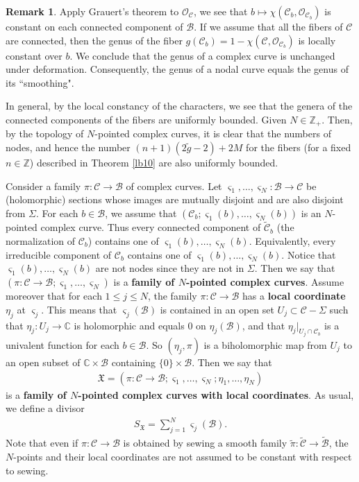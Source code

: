 \documentclass[12pt,a4paper,notitlepage]{report}
\theoremstyle{definition}
\newtheorem{rem}[df]{Remark}
\theoremstyle{plain}
\newcommand{\fk}{\mathfrak}
\newcommand{\mc}{\mathcal}
\newcommand{\wtd}{\widetilde}
\newcommand{\scr}{\mathscr}
\newcommand{\sgm}{\varsigma}
\newcommand{\SX}{S_{\fk X}}
\newcommand{\mbb}{\mathbb}
\newcommand{\Cbb}{\mathbb C}
\newcommand{\Zbb}{\mathbb Z}
\numberwithin{equation}{section}
\begin{document}
\begin{rem}\label{lb124}
Apply Grauert's theorem to $\scr O_{\mc C}$, we see that $b\mapsto\chi(\mc C_b,\scr O_{\mc C_b})$ is constant on each connected component of $\mc B$. If we assume that all the fibers of $\mc C$ are  connected, then the genus of the fiber $g(\mc C_b)=1-\chi(\mc C,\scr O_{\mc C_b})$ is locally constant over $b$. We conclude that the genus of a complex curve is unchanged under deformation. Consequently, the genus of a nodal curve equals the genus of its ``smoothing". 

In general, by the local constancy of the characters, we see that the genera of the connected components of the fibers are uniformly bounded. Given $N\in \Zbb_+$. Then, by the topology of $N$-pointed complex curves, it is clear that the numbers of nodes, and hence the number $(n+1)(2\wtd g-2)+2M$ for the fibers (for a fixed $n\in\Zbb$) described in Theorem \ref{lb10} are also uniformly bounded. 
\end{rem}

Consider a family $\pi:\mc C\rightarrow\mc B$ of complex curves. Let $\sgm_1,\dots,\sgm_N:\mc B\rightarrow\mc C$ be (holomorphic) sections whose images are mutually disjoint and are also disjoint from $\Sigma$. For each $b\in\mc B$, we assume that $(\mc C_b;\sgm_1(b),\dots,\sgm_N(b))$ is an $N$-pointed complex curve. Thus every connected component of $\wtd{\mc C}_b$ (the normalization  of $\mc C_b$) contains one of $\sgm_1(b),\dots,\sgm_N(b)$. Equivalently, every irreducible component of $\mc C_b$ contains one of $\sgm_1(b),\dots,\sgm_N(b)$. Notice that  $\sgm_1(b),\dots,\sgm_N(b)$ are not nodes since they are not in $\Sigma$. Then we say that $(\pi:\mc C\rightarrow\mc B;\sgm_1,\dots,\sgm_N)$ is a \textbf{family of $N$-pointed complex curves}. Assume moreover that for each $1\leq j\leq N$, the family $\pi:\mc C\rightarrow\mc B$ has a \textbf{local coordinate} $\eta_j$ at $\sgm_j$. This means that $\sgm_j(\mc B)$ is contained in an open set $U_j\subset\mc C-\Sigma$ such that $\eta_j:U_j\rightarrow\Cbb$ is holomorphic and equals $0$ on $\eta_j(\mc B)$,  and that $\eta_j|_{U_j\cap\mc C_b}$ is a univalent function  for each $b\in\mc B$. So $(\eta_j,\pi)$ is a biholomorphic map from $U_j$ to an open subset of $\mbb C\times\mc B$ containing $\{0\}\times\mc B$. Then we say that 
\begin{align*}
\fk X=(\pi:\mc C\rightarrow\mc B;\sgm_1,\dots,\sgm_N;\eta_1,\dots,\eta_N)
\end{align*}
is a \textbf{family of $N$-pointed complex curves with local coordinates}. As usual, we define a divisor
\begin{align*}
\SX=\sum_{j=1}^N\sgm_j(\mc B).
\end{align*}
Note that even if $\pi:\mc C\rightarrow\mc B$ is obtained by sewing a smooth family $\wtd{\pi}:\wtd{\mc C}\rightarrow\wtd{\mc B}$, the $N$-points and their local coordinates are not assumed to be constant with respect to sewing.
\end{document}
